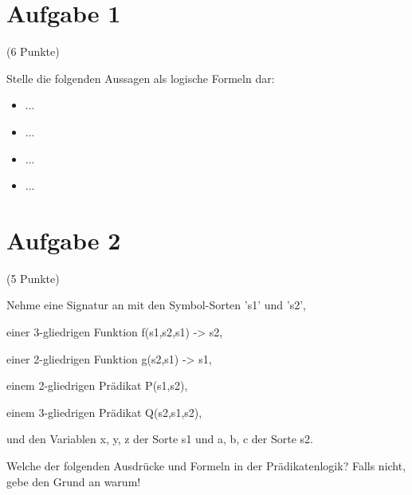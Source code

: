 \documentclass{exam}
\author{Valentin Richter}
\newcommand{\Punkte}[1]{\begin{flushright}(#1 Punkte)\end{flushright}}
\begin{document}
	
	\section{Aufgabe 1}
		
	\Punkte{6}
	
	Stelle die folgenden Aussagen als logische Formeln dar:
	
	\begin{itemize}
		
		\item ...
		\item ...
		\item ...
		\item ...
		
	\end{itemize}
	
	\clearpage
	\section{Aufgabe 2}
	
	\Punkte{5}
	
	Nehme eine Signatur an mit den Symbol-Sorten 's1' und 's2',
	
	einer 3-gliedrigen Funktion f(s1,s2,s1) -> s2,
	
	einer 2-gliedrigen Funktion g(s2,s1) -> s1,
	
	einem 2-gliedrigen Prädikat P(s1,s2),
	
	einem 3-gliedrigen Prädikat Q(s2,s1,s2),
	
	und den Variablen x, y, z der Sorte s1 und a, b, c der Sorte s2.
	
	Welche der folgenden Ausdrücke und Formeln in der Prädikatenlogik? Falls nicht, gebe den Grund an warum!
	
\end{document}
